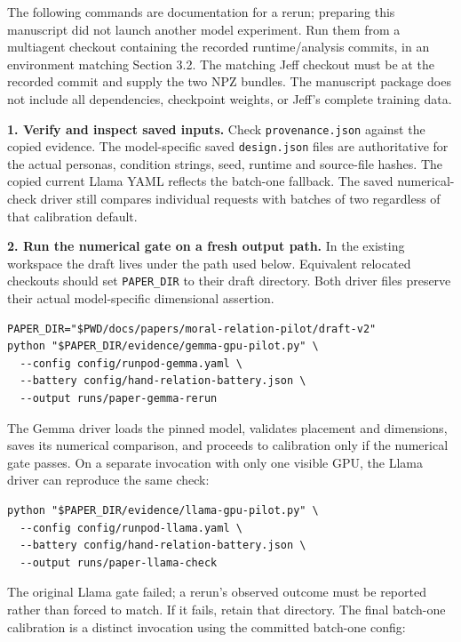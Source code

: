The following commands are documentation for a rerun; preparing this manuscript did not launch another model experiment. Run them from a multiagent checkout containing the recorded runtime/analysis commits, in an environment matching Section 3.2. The matching Jeff checkout must be at the recorded commit and supply the two NPZ bundles. The manuscript package does not include all dependencies, checkpoint weights, or Jeff's complete training data.

\textbf{1. Verify and inspect saved inputs.} Check \texttt{provenance.json} against the copied evidence. The model-specific saved \texttt{design.json} files are authoritative for the actual personas, condition strings, seed, runtime and source-file hashes. The copied current Llama YAML reflects the batch-one fallback. The saved numerical-check driver still compares individual requests with batches of two regardless of that calibration default.

\textbf{2. Run the numerical gate on a fresh output path.} In the existing workspace the draft lives under the path used below. Equivalent relocated checkouts should set \nolinkurl{PAPER_DIR} to their draft directory. Both driver files preserve their actual model-specific dimensional assertion.

\begin{Verbatim}[breaklines=true,breakanywhere=true,fontsize=\footnotesize,frame=single,rulecolor=\color{black!20},framesep=5pt]
PAPER_DIR="$PWD/docs/papers/moral-relation-pilot/draft-v2"
python "$PAPER_DIR/evidence/gemma-gpu-pilot.py" \
  --config config/runpod-gemma.yaml \
  --battery config/hand-relation-battery.json \
  --output runs/paper-gemma-rerun
\end{Verbatim}

The Gemma driver loads the pinned model, validates placement and dimensions, saves its numerical comparison, and proceeds to calibration only if the numerical gate passes. On a separate invocation with only one visible GPU, the Llama driver can reproduce the same check:

\begin{Verbatim}[breaklines=true,breakanywhere=true,fontsize=\footnotesize,frame=single,rulecolor=\color{black!20},framesep=5pt]
python "$PAPER_DIR/evidence/llama-gpu-pilot.py" \
  --config config/runpod-llama.yaml \
  --battery config/hand-relation-battery.json \
  --output runs/paper-llama-check
\end{Verbatim}

The original Llama gate failed; a rerun's observed outcome must be reported rather than forced to match. If it fails, retain that directory. The final batch-one calibration is a distinct invocation using the committed batch-one config:

